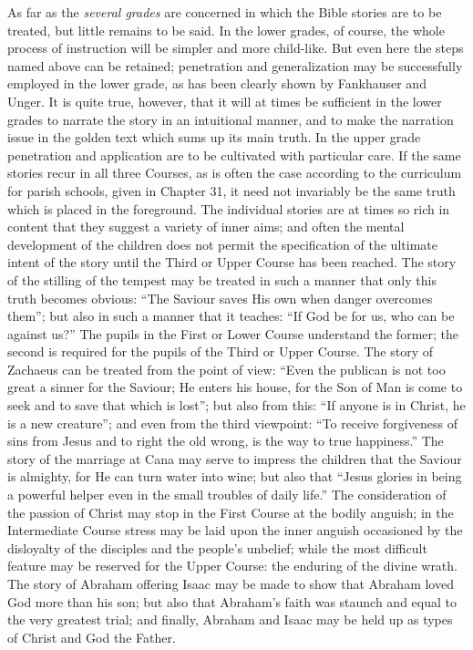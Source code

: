As far as the \emph{several grades} are concerned in which the Bible stories are to be treated, but little remains to be said. In the lower grades, of course, the whole process of instruction will be simpler and more child-like. But even here the steps named above can be retained; penetration and generalization may be successfully employed in the lower grade, as has been clearly shown by Fankhauser and Unger. It is quite true, however, that it will at times be sufficient in the lower grades to narrate the story in an intuitional manner, and to make the narration issue in the golden text which sums up its main truth. In the upper grade penetration and application are to be cultivated with particular care. If the same stories recur in all three Courses, as is often the case according to the curriculum for parish schools, given in Chapter 31, it need not invariably be the same truth which is placed in the foreground. The individual stories are at times so rich in content that they suggest a variety of inner aims; and often the mental development of the children does
not permit the specification of the ultimate intent of the story until the Third or Upper Course has been reached. The story of the stilling of the tempest may be treated in such a manner that only this truth becomes obvious: “The Saviour saves His own when danger overcomes them”; but also in such a manner that it teaches: “If God be for us, who can be against us?” The pupils in the First or Lower Course understand the former; the second is required for the pupils of the Third or Upper Course. The story of Zachaeus can be treated from the point of view: “Even the publican is not too great a sinner for the Saviour; He enters his house, for the Son of Man is come to seek and to save that which is lost”; but also from this: “If anyone is in Christ, he is a new creature”; and even from the third viewpoint: “To receive forgiveness of sins from Jesus and to right the old wrong, is the way to true happiness.” The story of the marriage at Cana may serve to impress the children that the Saviour is almighty, for He can turn water into wine; but also that “Jesus glories in being a powerful helper even in the small troubles of daily life.” The consideration of the passion of Christ may stop in the First Course at the bodily anguish; in the Intermediate Course stress may be laid upon the inner anguish occasioned by the disloyalty of the disciples and the people's unbelief; while the most difficult feature may be reserved for the Upper Course: the enduring of the divine wrath. The story of Abraham offering Isaac may be made to show that Abraham loved God more than his son; but also that Abraham's faith was staunch and equal to the very greatest trial; and finally, Abraham and Isaac may be held up as types of Christ and God the Father.

